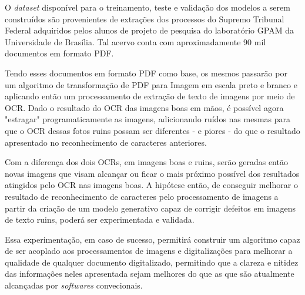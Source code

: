 O \textit{dataset} disponível para o treinamento, teste e validação dos modelos a serem construídos são provenientes de extrações dos processos do Supremo Tribunal Federal adquiridos pelos alunos de projeto de pesquisa do laboratório GPAM da Universidade de Brasília. Tal acervo conta com aproximadamente 90 mil documentos em formato PDF.

Tendo esses documentos em formato PDF como base, os mesmos passarão por um algoritmo de transformação de PDF para Imagem em escala preto e branco e aplicando então um processamento de extração de texto de imagens por meio de OCR. Dado o resultado do OCR das imagens boas em mãos, é possível agora "estragar" programaticamente as imagens, adicionando ruídos nas mesmas para que o OCR dessas fotos ruins possam ser diferentes - e piores - do que o resultado apresentado no reconhecimento de caracteres anteriores.

Com a diferença dos dois OCRs, em imagens boas e ruins, serão geradas então novas imagens que visam alcançar ou ficar o mais próximo possível dos resultados atingidos pelo OCR nas imagens boas. A hipótese então, de conseguir melhorar o resultado de reconhecimento de caracteres pelo processamento de imagens a partir da criação de um modelo generativo capaz de corrigir defeitos em imagens de texto ruins, poderá ser experimentada e validada.

Essa experimentação, em caso de sucesso, permitirá construir um algoritmo capaz de ser acoplado aos processamentos de imagens e digitalizações para melhorar a qualidade de qualquer documento digitalizado, permitindo que a clareza e nitidez das informações neles apresentada sejam melhores do que as que são atualmente alcançadas por \textit{softwares} convecionais.


